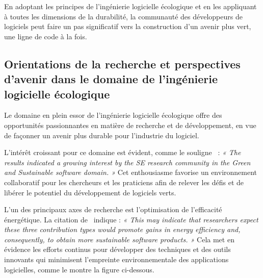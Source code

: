 En adoptant les principes de l'ingénierie logicielle écologique et en les appliquant à toutes les dimensions de la durabilité, la communauté des développeurs de logiciels peut faire un pas significatif vers la construction d'un avenir plus vert, une ligne de code à la fois.


\subsection{Orientations de la recherche et perspectives d'avenir dans le domaine de l'ingénierie logicielle écologique}
Le domaine en plein essor de l'ingénierie logicielle écologique offre des opportunités passionnantes en matière de recherche et de développement, en vue de façonner un avenir plus durable pour l'industrie du logiciel.


L'intérêt croissant pour ce domaine est évident, comme le souligne~\cite{GreenSustainableEngMapping} : \emph{« The results indicated a growing interest by the SE research community in the Green and Sustainable software domain. »} Cet enthousiasme favorise un environnement collaboratif pour les chercheurs et les praticiens afin de relever les défis et de libérer le potentiel du développement de logiciels verts.


L'un des principaux axes de recherche est l'optimisation de l'efficacité énergétique. La citation de~\cite{GreenSustainableEngMapping} indique : \emph{« This may indicate that researchers expect these three contribution types would promote gains in energy efficiency and, consequently, to obtain more sustainable software products. »} Cela met en évidence les efforts continus pour développer des techniques et des outils innovants qui minimisent l'empreinte environnementale des applications logicielles, comme le montre la figure ci-dessous.

